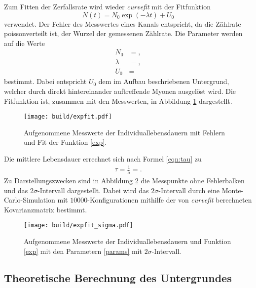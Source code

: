 Zum Fitten der Zerfallsrate wird wieder \emph{curvefit} mit der Fitfunktion
\begin{equation}
  N(t) = N_0 \exp{(-\lambda t)} + U_0 \label{exp}
\end{equation}
verwendet.
Der Fehler des Messwertes eines Kanals entspricht, da die Zählrate poissonverteilt ist, der Wurzel der gemessenen Zählrate. %
Die Parameter werden auf die Werte \label{params}
\begin{align*}
  N_0 &= ,\\
  \lambda &= ,\\
  U_0 &= 
\end{align*}
bestimmt.
Dabei entspricht $U_0$ dem im Aufbau beschriebenen Untergrund, welcher durch direkt hintereinander auftreffende Myonen ausgelöst wird.
Die Fitfunktion ist, zusammen mit den Messwerten, in Abbildung \ref{plot:punkte_err_fit} dargestellt.
\begin{figure}
  \centering
  \texttt{[image: build/expfit.pdf]}
  \caption{Aufgenommene Messwerte der Individuallebensdauern mit Fehlern und Fit der Funktion \ref{exp}.}
  \label{plot:punkte_err_fit}
\end{figure}
Die mittlere Lebensdauer errechnet sich nach Formel \eqref{eqn:tau} zu
\begin{align}
  \label{eqn:result}
  \tau = \frac{1}{\lambda} = .
\end{align}
Zu Darstellungszwecken sind in Abbildung \ref{plot:punkte_sigma} die Messpunkte ohne Fehlerbalken und das $2\sigma$-Intervall dargestellt.
Dabei wird das $2\sigma$-Intervall durch eine Monte-Carlo-Simulation mit $\num{10000}$-Konfigurationen mithilfe der von \emph{curvefit} berechneten Kovarianzmatrix bestimmt.

\begin{figure}
  \centering
  \texttt{[image: build/expfit\_sigma.pdf]}
  \caption{Aufgenommene Messwerte der Individuallebensdauern und Funktion \ref{exp} mit den Parametern \ref{params} mit $2\sigma$-Intervall.}
  \label{plot:punkte_sigma}
\end{figure}


\subsection{Theoretische Berechnung des Untergrundes}

